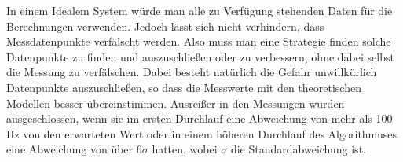 
In einem Idealem System würde man alle zu Verfügung stehenden Daten für die Berechnungen verwenden. Jedoch lässt sich nicht verhindern, dass Messdatenpunkte verfälscht werden. Also muss man eine Strategie finden solche Datenpunkte zu finden und auszuschließen oder zu verbessern, ohne dabei selbst die Messung zu verfälschen. Dabei besteht natürlich die Gefahr unwillkürlich Datenpunkte auszuschließen, so dass die Messwerte mit den theoretischen Modellen besser übereinstimmen.
Ausreißer in den Messungen wurden ausgeschlossen, wenn sie im ersten Durchlauf eine Abweichung von mehr als 100 Hz von den erwarteten Wert oder in einem höheren Durchlauf des Algorithmuses eine Abweichung von über $6\sigma$ hatten, wobei $\sigma$ die Standardabweichung ist.\cite{Levy2008} %
